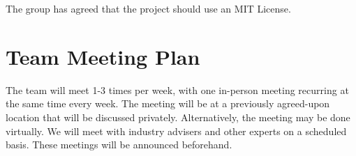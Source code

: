 \documentclass{article}
\begin{document}
The group has agreed that the project should use an MIT License.


\section{Team Meeting Plan}


The team will meet 1-3 times per week, with one in-person meeting recurring at 
the same time every week. The meeting will be at a previously agreed-upon 
location that will be discussed privately. Alternatively, the meeting may be 
done virtually. We will meet with industry advisers and  other experts on a 
scheduled basis. These meetings will be announced beforehand. 
\end{document}
